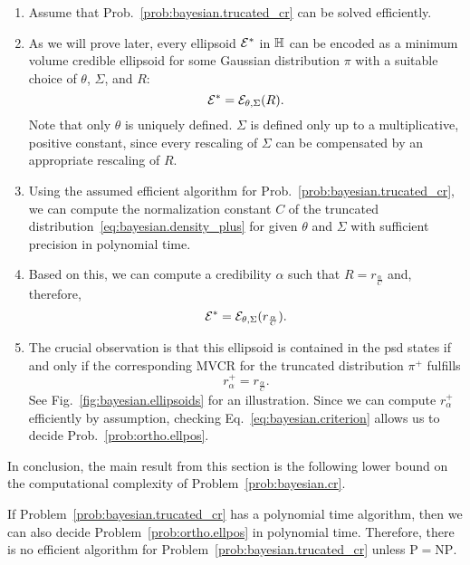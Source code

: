 \begin{enumerate}
  \item Assume that Prob.~\ref{prob:bayesian.trucated_cr} can be solved efficiently.

  \item As we will prove later, every ellipsoid $\mathcal{E}^*$ in $\mathbb{H}$ can be encoded as a minimum volume credible ellipsoid for some Gaussian distribution $\pi$ with a suitable choice of $\theta$, $\Sigma$, and $R$:
  \begin{equation}
    \mathcal{E}^* = \mathcal{E}_{\theta,\Sigma}(R).
  \end{equation}
  Note that only $\theta$ is uniquely defined.
  $\Sigma$ is defined only up to a multiplicative, positive constant, since every rescaling of $\Sigma$ can be compensated by an appropriate rescaling of $R$.

  \item  Using the assumed efficient algorithm for Prob.~\ref{prob:bayesian.trucated_cr}, we can compute the normalization constant $C$ of the truncated distribution~\eqref{eq:bayesian.density_plus} for given $\theta$ and $\Sigma$ with sufficient precision in polynomial time.

  \item Based on this, we can compute a credibility $\alpha$ such that $R = r_\frac{\alpha}{C}$ and, therefore,
  \begin{equation}
    \mathcal{E}^* = \mathcal{E}_{\theta,\Sigma}(r_\frac{\alpha}{C}).
  \end{equation}

  \item The crucial observation is that this ellipsoid is contained in the psd states if and only if the corresponding MVCR for the truncated distribution $\pi^+$ fulfills
  \begin{equation}
    \label{eq:bayesian.criterion}
    r^+_{\alpha} = r_\frac{\alpha}{C}.
  \end{equation}
  See Fig.~\ref{fig:bayesian.ellipsoids} for an illustration.
  Since we can compute $r^+_{\alpha}$ efficiently by assumption, checking Eq.~\eqref{eq:bayesian.criterion} allows us to decide Prob.~\ref{prob:ortho.ellpos}.
\end{enumerate}

In conclusion, the main result from this section is the following lower bound on the computational complexity of Problem~\ref{prob:bayesian.cr}.
\begin{theorem}\label{thm:bayesian.hardness}
  If Problem~\ref{prob:bayesian.trucated_cr} has a polynomial time algorithm, then we can also decide Problem~\ref{prob:ortho.ellpos} in polynomial time.
  Therefore, there is no efficient algorithm for Problem~\ref{prob:bayesian.trucated_cr} unless $\mathrm{P} = \mathrm{NP}$.
\end{theorem}

